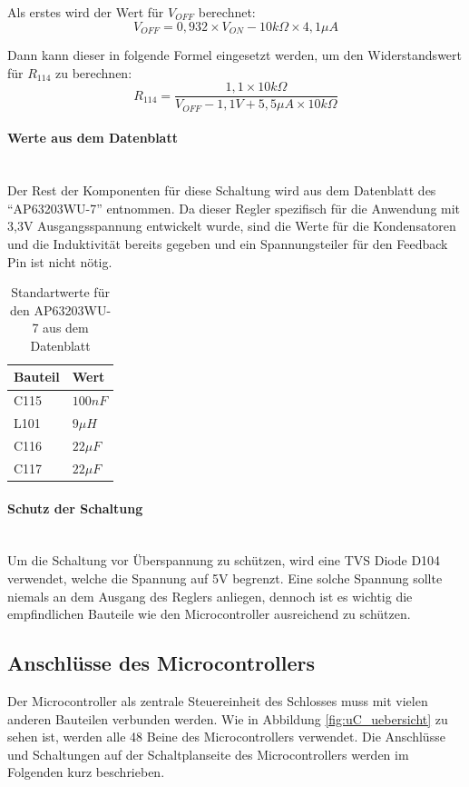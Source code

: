 Als erstes wird der Wert für \(V_{OFF}\) berechnet:
\[V_{OFF} = 0,932 \times V_{ON} - 10k\Omega \times 4,1\mu A\]

Dann kann dieser in folgende Formel eingesetzt werden, um den Widerstandswert für \(R_{114}\) zu berechnen:
\[R_{114} = \frac{1,1 \times 10k\Omega}{V_{OFF} - 1,1V + 5,5\mu A \times 10k\Omega}\]

\paragraph{Werte aus dem Datenblatt}\mbox{}\\
Der Rest der Komponenten für diese Schaltung wird aus dem Datenblatt des \enquote{AP63203WU-7} entnommen. Da dieser Regler spezifisch
für die Anwendung mit 3,3V Ausgangsspannung entwickelt wurde, sind die Werte für die Kondensatoren und die Induktivität bereits
gegeben und ein Spannungsteiler für den Feedback Pin ist nicht nötig.
\begin{table}[H]
    \centering
    \begin{tabular}{|l|l|}
        \hline
        \textbf{Bauteil} & \textbf{Wert} \\
        \hline
        C115             & \(100nF\)     \\
        \hline
        L101             & \(9\mu H\)    \\
        \hline
        C116             & \(22\mu F\)   \\
        \hline
        C117             & \(22\mu F\)   \\
        \hline
    \end{tabular}
    \caption{Standartwerte für den AP63203WU-7 aus dem Datenblatt\cite{AP63203WU}}
    \label{tab:AP63203WU}
\end{table}

\paragraph{Schutz der Schaltung}\mbox{}\\
Um die Schaltung vor Überspannung zu schützen, wird eine \ac{TVS} Diode D104 verwendet, welche die Spannung auf 5V begrenzt.
Eine solche Spannung sollte niemals an dem Ausgang des Reglers anliegen, dennoch ist es wichtig die empfindlichen Bauteile
wie den Microcontroller ausreichend zu schützen.

\subsection{Anschlüsse des Microcontrollers}
Der Microcontroller als zentrale Steuereinheit des Schlosses muss mit vielen anderen Bauteilen verbunden werden. Wie in
Abbildung \ref{fig:uC_uebersicht} zu sehen ist, werden alle 48 Beine des Microcontrollers verwendet. Die Anschlüsse
und Schaltungen auf der Schaltplanseite des Microcontrollers werden im Folgenden kurz beschrieben.

